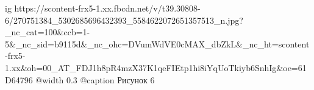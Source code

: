  
 
 
 
 

\ifcmt
  ig https://scontent-frx5-1.xx.fbcdn.net/v/t39.30808-6/270751384_5302685696432393_5584622072651357513_n.jpg?_nc_cat=100&ccb=1-5&_nc_sid=b9115d&_nc_ohc=DVumWdVE0cMAX_dbZkL&_nc_ht=scontent-frx5-1.xx&oh=00_AT_FDJ1h8pR4mzX37K1qeFIEtp1hi8iYqUoTkiyb6SnhIg&oe=61D64796
  @width 0.3
	@caption Рисунок 6
\fi
